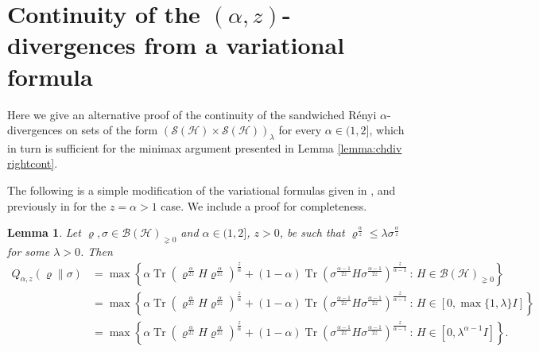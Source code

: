 \documentclass[unsortedaddress,superscriptaddress,pra,notitlepage]{revtex4}
\newtheorem{lemma}[definition]{Lemma}
\def\B{{\mathcal B}}
\def\S{{\mathcal S}}
\def\rho{\varrho}
\def\hil{{\mathcal H}}
\def\bz{\left(}
\def\jz{\right)}
\def\pne{_{\gneq 0}}
\DeclareMathOperator{\Tr}{Tr}
\begin{document}
\section{Continuity of the $(\alpha,z)$-divergences from a variational formula}
\label{sec:variational}

Here we give an alternative proof of the continuity of the 
sandwiched R\'enyi $\alpha$-divergences on sets of the form 
$(\S(\hil)\times\S(\hil))_{\lambda}$
for every $\alpha\in(1,2]$, which in turn is sufficient for the minimax argument 
presented in Lemma \ref{lemma:chdiv rightcont}.

The following is a simple modification of the 
variational formulas given in \cite{Zhang2018}, and previously in 
\cite{FL} for the $z=\alpha>1$ case. 
We include a proof for completeness.

\begin{lemma}\label{lemma:variational}
Let $\rho,\sigma\in\B(\hil)\pne$ and $\alpha\in(1,2]$, $z>0$, be such that 
$\rho^{\frac{\alpha}{z}}\le\lambda\sigma^{\frac{\alpha}{z}}$ for some $\lambda>0$.
Then
\begin{align}
Q_{\alpha,z}(\rho\|\sigma)
&=
\max\left\{
\alpha\Tr \bz \rho^{\frac{\alpha}{2z}} H\rho^{\frac{\alpha}{2z}} \jz^{\frac{z}{\alpha}}
+(1-\alpha)\Tr\bz \sigma^{\frac{\alpha-1}{2z}}H\sigma^{\frac{\alpha-1}{2z}}\jz^{\frac{z}{\alpha-1}}
\,:\,H\in\B(\hil)\pne\right\}\label{a-z variational3}\\
&=
\max\left\{
\alpha\Tr \bz \rho^{\frac{\alpha}{2z}} H\rho^{\frac{\alpha}{2z}} \jz^{\frac{z}{\alpha}}
+(1-\alpha)\Tr\bz \sigma^{\frac{\alpha-1}{2z}}H\sigma^{\frac{\alpha-1}{2z}}\jz^{\frac{z}{\alpha-1}}
\,:\,H\in[0,\max\{1,\lambda\}I]\right\}\label{a-z variational2}\\
&=
\max\left\{
\alpha\Tr \bz \rho^{\frac{\alpha}{2z}} H\rho^{\frac{\alpha}{2z}} \jz^{\frac{z}{\alpha}}
+(1-\alpha)\Tr\bz \sigma^{\frac{\alpha-1}{2z}}H\sigma^{\frac{\alpha-1}{2z}}\jz^{\frac{z}{\alpha-1}}
\,:\,H\in[0,\lambda^{\alpha-1}I]\right\}\label{a-z variational}.
\end{align}
\end{lemma}
\end{document}
